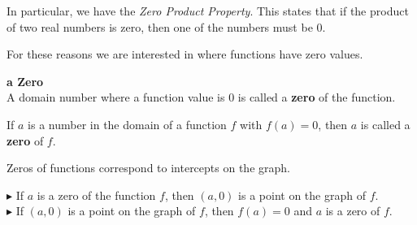 \documentclass{ximera}
\begin{document}
In particular, we have the \textit{Zero Product Property}.  This states that if the product of two real numbers is zero, then one of the numbers must be $0$.

For these reasons we are interested in where functions have zero values.






\begin{definition}  \textbf{\textcolor{green!50!black}{a Zero}} \\


A domain number where a function value is $0$ is called a \textbf{zero} of the function.


\begin{center}
If $a$ is a number in the domain of a function $f$ with $f(a) = 0$, then $a$ is called a \textbf{zero} of $f$.
\end{center}




\end{definition}





Zeros of functions correspond to intercepts on the graph.



$\blacktriangleright$ If $a$ is a zero of the function $f$, then $(a, 0)$ is a point on the graph of $f$. \\


$\blacktriangleright$ If $(a, 0)$ is a point on the graph of $f$, then $f(a) = 0$ and $a$ is a zero of $f$.
\end{document}
